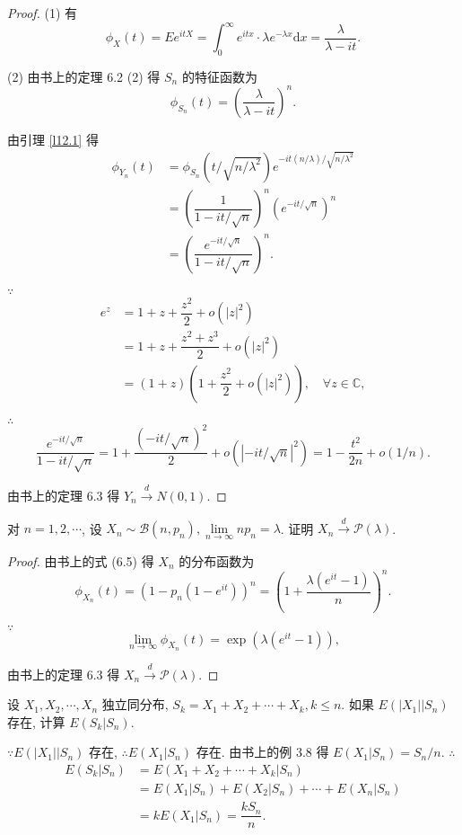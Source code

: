 \documentclass{ctexart}
\begin{document}
\begin{proof}
    (1) 有
    \[\phi_X(t)=Ee^{itX}=\int_0^\infty e^{itx}\cdot\lambda e^{-\lambda x}\mathrm{d}x=\dfrac{\lambda}{\lambda-it}.\]

    (2) 由书上的定理 6.2 (2) 得 $S_n$ 的特征函数为
    \[\phi_{S_n}(t)=\left(\dfrac{\lambda}{\lambda-it}\right)^n.\]

    由引理 \ref{l12.1} 得
    \begin{align*}
        \phi_{Y_n}(t) & =\phi_{S_n}(t/\sqrt{n/\lambda^2})e^{-it(n/\lambda)/\sqrt{n/\lambda^2}} \\
        & =\left(\dfrac{1}{1-it/\sqrt{n}}\right)^n(e^{-it/\sqrt{n}})^n \\
        & =\left(\dfrac{e^{-it/\sqrt{n}}}{1-it/\sqrt{n}}\right)^n.
    \end{align*}

    $\because$
    \begin{align*}
        e^z & =1+z+\dfrac{z^2}{2}+o(|z|^2) \\
        & =1+z+\dfrac{z^2+z^3}{2}+o(|z|^2) \\
        & =(1+z)\left(1+\dfrac{z^2}{2}+o(|z|^2)\right),\quad\forall z\in\mathbb{C},
    \end{align*}

    $\therefore$
    \[\dfrac{e^{-it/\sqrt{n}}}{1-it/\sqrt{n}}=1+\dfrac{(-it/\sqrt{n})^2}{2}+o(|-it/\sqrt{n}|^2)=1-\dfrac{t^2}{2n}+o(1/n).\]

    由书上的定理 6.3 得 $Y_n\xrightarrow{d}N(0,1)$.
\end{proof}
\addtocounter{exercise}{3}
\begin{exercise}%
    对 $n=1,2,\cdots$, 设 $X_n\sim\mathcal{B}(n,p_n),\lim\limits_{n\to\infty}np_n=\lambda$. 证明 $X_n\xrightarrow{d}\mathcal{P}(\lambda)$.
\end{exercise}
\begin{proof}
    由书上的式 (6.5) 得 $X_n$ 的分布函数为
    \[\phi_{X_n}(t)=(1-p_n(1-e^{it}))^n=\left(1+\dfrac{\lambda(e^{it}-1)}{n}\right)^n.\]

    $\because$
    \[\lim\limits_{n\to\infty}\phi_{X_n}(t)=\exp(\lambda(e^{it}-1)),\]

    由书上的定理 6.3 得 $X_n\xrightarrow{d}\mathcal{P}(\lambda)$.
\end{proof}
\begin{exercise}%
    设 $X_1,X_2,\cdots,X_n$ 独立同分布, $S_k=X_1+X_2+\cdots+X_k,k\leq n$. 如果 $E(|X_1|\big|S_n)$ 存在, 计算 $E(S_k|S_n)$.
\end{exercise}
\begin{solution}
    $\because E(|X_1|\big|S_n)$ 存在, $\therefore E(X_1\big|S_n)$ 存在. 由书上的例 3.8 得 $E(X_1\big|S_n)=S_n/n$. $\therefore$
    \begin{align*}
        E(S_k|S_n) & =E(X_1+X_2+\cdots+X_k|S_n) \\
        & =E(X_1\big|S_n)+E(X_2\big|S_n)+\cdots+E(X_n\big|S_n) \\
        & =kE(X_1\big|S_n)=\dfrac{kS_n}{n}.
    \end{align*}
\end{solution}
\end{document}

